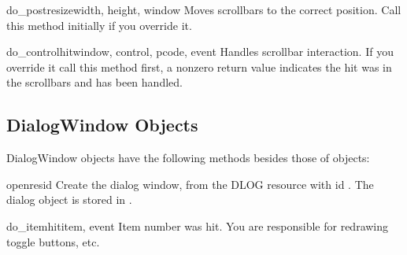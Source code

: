 \begin{methoddesc}[ScrolledWindow]{do_postresize}{width, height, window}
Moves scrollbars to the correct position. Call this method initially
if you override it.
\end{methoddesc}

\begin{methoddesc}[ScrolledWindow]{do_controlhit}{window, control,
                                                  pcode, event}
Handles scrollbar interaction. If you override it call this method
first, a nonzero return value indicates the hit was in the scrollbars
and has been handled.
\end{methoddesc}


\subsection{DialogWindow Objects \label{dialogwindow-objects}}

DialogWindow objects have the following methods besides those of
 objects:


\begin{methoddesc}[DialogWindow]{open}{resid}
Create the dialog window, from the DLOG resource with id
. The dialog object is stored in .
\end{methoddesc}

\begin{methoddesc}[DialogWindow]{do_itemhit}{item, event}
Item number  was hit. You are responsible for redrawing
toggle buttons, etc.
\end{methoddesc}
